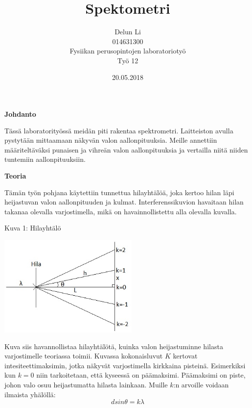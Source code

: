 \documentclass[11pt,a4paper]{article}
\title{Spektometri}
\author{Delun Li\\014631300\\Fysiikan perusopintojen laboratoriotyö\\Työ 12}
\date{20.05.2018}
\begin{document}
\maketitle

\pagebreak

\noindent\Large\textbf{Johdanto}

\vspace{0.5cm}

\noindent Tässä laboratorityössä meidän piti rakentaa spektrometri. Laitteiston avulla pystytään mittaamaan näkyvän valon aallonpituuksia. Meille annettiin määriteltäväksi punaisen ja vihreän valon aallonpituuksia ja vertailla niitä niiden tuntemiin aallonpituuksiin.  

\vspace{0.5cm}

\noindent\Large\textbf{Teoria}

\vspace{0.5cm}

\noindent Tämän työn pohjana käytettiin tunnettua hilayhtälöä, joka kertoo hilan läpi heijastuvan valon aallonpituuden ja kulmat. Interferenssikuvion  havaitaan hilan takanaa olevalla varjostimella, mikä on havainnollistettu alla olevalla kuvalla. 

\vspace{0.3cm}

\noindent Kuva 1: Hilayhtälö

\hspace{2cm}\includegraphics[height=5cm]{Hilayhtalokuva.jpg}

\noindent Kuva siis havannollistaa hilayhtälötä, kuinka valon heijastuminne hilasta varjostimelle teoriassa toimii. Kuvassa kokonaisluvut $K$ kertovat intesiteettimaksimin, jotka näkyvät varjostimella kirkkaina pisteinä. Esimerkiksi kun $k=0$ niin tarkoitetaan, että kyseessä on päämaksimi. Päämaksimi on piste, johon valo osuu heijastumatta hilasta lainkaan. Muille $k$:n arvoille voidaan ilmaista yhälöllä:
\begin{equation}
d sin\theta = k\lambda
\end{equation}
\end{document}
